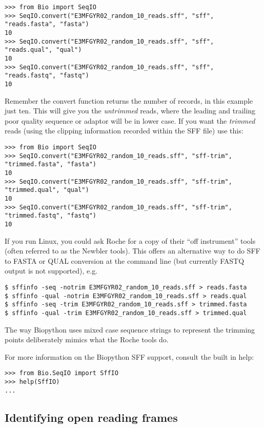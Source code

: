 \begin{verbatim}
>>> from Bio import SeqIO
>>> SeqIO.convert("E3MFGYR02_random_10_reads.sff", "sff", "reads.fasta", "fasta")
10
>>> SeqIO.convert("E3MFGYR02_random_10_reads.sff", "sff", "reads.qual", "qual")
10
>>> SeqIO.convert("E3MFGYR02_random_10_reads.sff", "sff", "reads.fastq", "fastq")
10
\end{verbatim}

\noindent Remember the convert function returns the number of records, in
this example just ten. This will give you the \emph{untrimmed} reads, where
the leading and trailing poor quality sequence or adaptor will be in lower
case. If you want the \emph{trimmed} reads (using the clipping information
recorded within the SFF file) use this:

\begin{verbatim}
>>> from Bio import SeqIO
>>> SeqIO.convert("E3MFGYR02_random_10_reads.sff", "sff-trim", "trimmed.fasta", "fasta")
10
>>> SeqIO.convert("E3MFGYR02_random_10_reads.sff", "sff-trim", "trimmed.qual", "qual")
10
>>> SeqIO.convert("E3MFGYR02_random_10_reads.sff", "sff-trim", "trimmed.fastq", "fastq")
10
\end{verbatim}

If you run Linux, you could ask Roche for a copy of their ``off instrument''
tools (often referred to as the Newbler tools). This offers an alternative way to
do SFF to FASTA or QUAL conversion at the command line (but currently FASTQ output
is not supported), e.g.

\begin{verbatim}
$ sffinfo -seq -notrim E3MFGYR02_random_10_reads.sff > reads.fasta
$ sffinfo -qual -notrim E3MFGYR02_random_10_reads.sff > reads.qual
$ sffinfo -seq -trim E3MFGYR02_random_10_reads.sff > trimmed.fasta
$ sffinfo -qual -trim E3MFGYR02_random_10_reads.sff > trimmed.qual
\end{verbatim}

\noindent The way Biopython uses mixed case sequence strings to represent
the trimming points deliberately mimics what the Roche tools do.

For more information on the Biopython SFF support, consult the built in help:

\begin{verbatim}
>>> from Bio.SeqIO import SffIO
>>> help(SffIO)
...
\end{verbatim}

\subsection{Identifying open reading frames}

